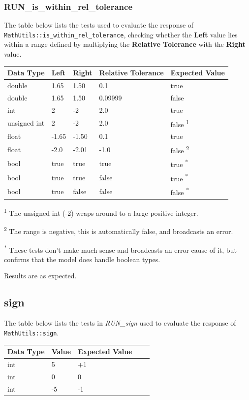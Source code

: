 \documentclass[11pt,fleqn]{report}
\begin{document}
\subsubsection{RUN\_is\_within\_rel\_tolerance}
The table below lists the tests used to evaluate the response of \\
\texttt{MathUtils::is\_within\_rel\_tolerance}, checking 
whether the \textbf{Left} value lies within a range defined by multiplying
the \textbf{Relative Tolerance} with the \textbf{Right} value.
\begin{center}
\begin{tabular}{|l||l|l|l|l|}
\hline
 \textbf{Data Type} & \textbf{Left} & \textbf{Right} &
 \textbf{Relative Tolerance} & \textbf {Expected Value} \\
\hline \hline
double & 1.65 & 1.50 & 0.1 & true \\
double & 1.65 & 1.50 & 0.09999 & false \\
int& 2 & -2 & 2.0 & true \\
unsigned int & 2 & -2 & 2.0 & false \textsuperscript{1} \\
float & -1.65 & -1.50 & 0.1 & true \\
float & -2.0 & -2.01 & -1.0 & false \textsuperscript{2} \\
bool &true & true & true & true \textsuperscript{*}\\
bool &true & true & false & true \textsuperscript{*}\\
bool &true & false & false & false \textsuperscript{*}\\
\hline \hline
\end{tabular}
\end{center}

\textsuperscript{1} The unsigned int (-2) wraps around to a large positive
integer.

\textsuperscript{2} The range is negative, this is automatically false, and 
broadcasts an error.

\textsuperscript{*} These tests don't make much sense and broadcasts an error
cause of it, but confirms that the model does handle boolean types.

Results are as expected.

\subsection{sign}
The table below lists the tests in \textit{RUN\_sign} used to evaluate the response of
\texttt{MathUtils::sign}.
\begin{center}
\begin{tabular}{|l||l|l|l|l|}
\hline
 \textbf{Data Type} & \textbf{Value} & \textbf{Expected Value} \\
\hline \hline
int &5 & +1 \\
int &0 &0 \\
int & -5 & -1 \\
\hline \hline 
\end{tabular}
\end{center}
\end{document}
